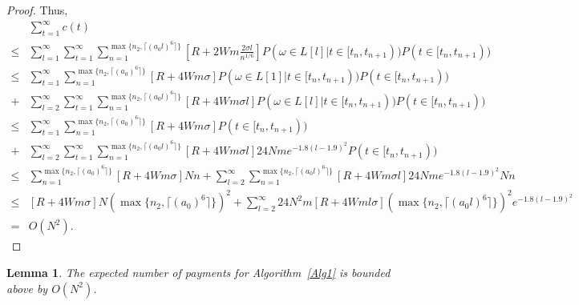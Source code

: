\documentclass{article}
\newtheorem{lemma}{Lemma}
\begin{document}
\begin{proof}
Thus,
\begin{align}
&\sum_{t=1}^{\infty}c(t) \nonumber \\
\leq&\sum_{l=1}^{\infty}\sum_{t=1}^{\infty}\sum_{n=1}^{\max\{n_2,\lceil (a_0 l)^6 \rceil\}}\left[R+2Wm\frac{2\sigma l}{n^{1/6}}\right]P(\omega\in L[l]|t\in [t_n,t_{n+1}))P(t\in [t_n,t_{n+1})) \nonumber \\
\leq& \sum_{t=1}^{\infty}\sum_{n=1}^{\max\{n_2,\lceil (a_0)^6 \rceil\}}\left[R+4Wm\sigma \right]P(\omega\in L[1]|t\in [t_n,t_{n+1}))P(t\in [t_n,t_{n+1})) \nonumber \\
+&\sum_{l=2}^{\infty}\sum_{t=1}^{\infty}\sum_{n=1}^{\max\{n_2,\lceil (a_0 l)^6 \rceil\}}\left[R+4Wm\sigma l\right]P(\omega\in L[l]|t\in [t_n,t_{n+1}))P(t\in [t_n,t_{n+1})) \nonumber \\
\leq& \sum_{t=1}^{\infty}\sum_{n=1}^{\max\{n_2,\lceil (a_0)^6 \rceil\}}\left[R+4Wm\sigma \right]P(t\in [t_n,t_{n+1})) \nonumber \\
+&\sum_{l=2}^{\infty}\sum_{t=1}^{\infty}\sum_{n=1}^{\max\{n_2,\lceil (a_0 l)^6 \rceil\}}\left[R+4Wm\sigma l\right]24Nme^{-1.8(l-1.9)^2}P(t\in [t_n,t_{n+1})) \nonumber \\
\leq& \sum_{n=1}^{\max\{n_2,\lceil (a_0)^6 \rceil\}}\left[R+4Wm\sigma \right]Nn +\sum_{l=2}^{\infty}\sum_{n=1}^{\max\{n_2,\lceil (a_0 l)^6 \rceil\}}\left[R+4Wm\sigma l\right]24Nme^{-1.8(l-1.9)^2}Nn \nonumber \\
\leq & \left[R+4Wm\sigma \right]N (\max\{n_2,\lceil (a_0)^6 \rceil\})^2+\sum_{l=2}^{\infty}24N^2 m[R+4Wml\sigma](\max\{n_2,\lceil (a_0 l)^6 \rceil\})^2 e^{-1.8(l-1.9)^2} \nonumber \\
=& O(N^2). \nonumber
\end{align}

\end{proof}


\begin{lemma}
The expected number of payments for Algorithm~\ref{Alg1} is bounded above by $O(N^2)$.
\label{lemma:numP}
\end{lemma}
\end{document}
